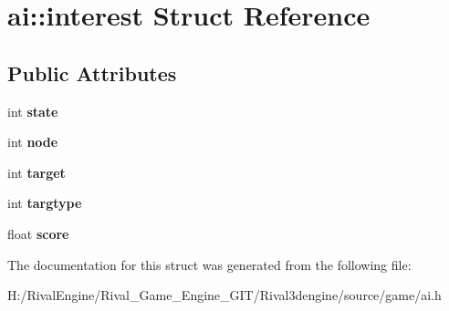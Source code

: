 \hypertarget{structai_1_1interest}{}\section{ai\+:\+:interest Struct Reference}
\label{structai_1_1interest}
\subsection*{Public Attributes}
\begin{DoxyCompactItemize}
\item 
\mbox{\label{structai_1_1interest_a49772a979b835dc65a2e2d7d92ba953f}} 
int {\bfseries state}
\item 
\mbox{\label{structai_1_1interest_a7b891b4a954e1b5da60d603c03348a9e}} 
int {\bfseries node}
\item 
\mbox{\label{structai_1_1interest_a79169352921c52bd3516f94132d06b68}} 
int {\bfseries target}
\item 
\mbox{\label{structai_1_1interest_ac0d878e7446e42e93349d5b25d42d102}} 
int {\bfseries targtype}
\item 
\mbox{\label{structai_1_1interest_a6d600b1ebe222bfaf8d98eec91e5328d}} 
float {\bfseries score}
\end{DoxyCompactItemize}


The documentation for this struct was generated from the following file\+:\begin{DoxyCompactItemize}
\item 
H\+:/\+Rival\+Engine/\+Rival\+\_\+\+Game\+\_\+\+Engine\+\_\+\+G\+I\+T/\+Rival3dengine/source/game/ai.\+h\end{DoxyCompactItemize}
